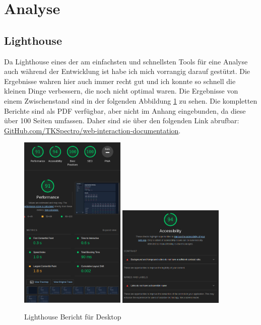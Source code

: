 \section{Analyse}

\subsection{Lighthouse}
\label{ssec:lighthouse}

Da Lighthouse eines der am einfachsten und schnellsten Tools für eine Analyse auch während der Entwicklung ist habe ich mich vorrangig darauf gestützt. Die Ergebnisse wahren hier auch immer recht gut und ich konnte so schnell die kleinen Dinge verbessern, die noch nicht optimal waren. Die Ergebnisse von einem Zwischenstand sind in der folgenden Abbildung \ref{fig:lighthouse_desktop_1} zu sehen. Die kompletten Berichte sind als PDF verfügbar, aber nicht im Anhang eingebunden, da diese über 100 Seiten umfassen. Daher sind sie über den folgenden Link abrufbar: \href{https://github.com/TKSpectro/web-interaction-documentation/tree/master/Reports}{GitHub.com/TKSpectro/web-interaction-documentation}.

\begin{figure}[th]
    \centering
    \includegraphics[width=0.45\textwidth]{Figures/lighthouse_desktop_1.png}
    \includegraphics[width=0.45\textwidth]{Figures/lighthouse_desktop_2.png}
    \decoRule
    \caption[Turbomeet Lighthouse Bericht Desktop]{Lighthouse Bericht für Desktop}
    \label{fig:lighthouse_desktop_1}
\end{figure}

